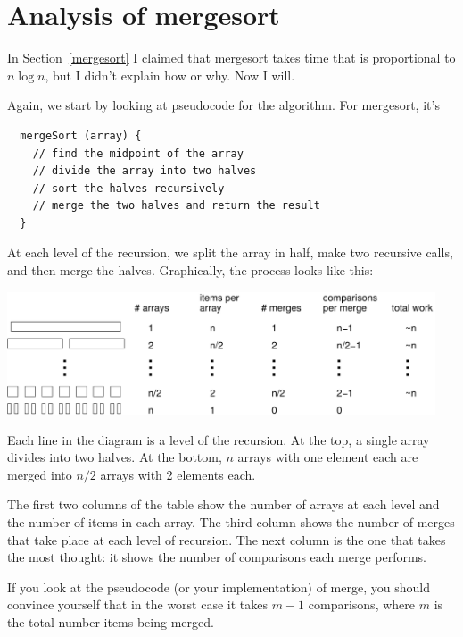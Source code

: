 \documentclass[12pt]{book}
\theoremstyle{exercise}
\begin{document}


\section {Analysis of mergesort}

In Section~\ref{mergesort} I claimed that mergesort takes time
that is proportional to $n \log n$, but I didn't explain how
or why.  Now I will.

Again, we start by looking at pseudocode for the algorithm.
For mergesort, it's

\begin{verbatim}
  mergeSort (array) {
    // find the midpoint of the array
    // divide the array into two halves
    // sort the halves recursively
    // merge the two halves and return the result
  }
\end{verbatim}
%
At each level of the recursion, we split the array in half,
make two recursive calls, and then merge the halves.  Graphically,
the process looks like this:
 
\includegraphics[width=5in]{figs/mergetree.pdf}
 
Each line in the diagram is a level of the recursion.  At the
top, a single array divides into two halves.  At the bottom, $n$
arrays with one element each are merged into $n/2$ arrays with
2 elements each.


The first two columns of the table show the number of arrays at each
level and the number of items in each array.  The third column shows
the number of merges that take place at each level of recursion.  The
next column is the one that takes the most thought: it shows the
number of comparisons each merge performs.


If you look at the pseudocode (or your implementation) of
merge, you should convince yourself that in the worst case it
takes $m-1$ comparisons, where $m$ is the total number items
being merged.
\end{document}
